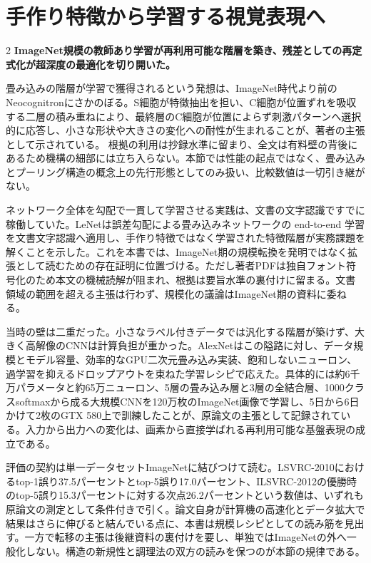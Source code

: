 \documentclass[lualatex,a4paper,10pt]{jlreq}
\begin{document}
\section{手作り特徴から学習する視覚表現へ}
\label{sec:p01}
\begin{multicols}{2}
\raggedcolumns
\noindent\textbf{ImageNet規模の教師あり学習が再利用可能な階層を築き、残差としての再定式化が超深度の最適化を切り開いた。}\autocite{vmd003,vmd004}\par\medskip
\noindent 畳み込みの階層が学習で獲得されるという発想は、ImageNet時代より前のNeocognitronにさかのぼる。S細胞が特徴抽出を担い、C細胞が位置ずれを吸収する二層の積み重ねにより、最終層のC細胞が位置によらず刺激パターンへ選択的に応答し、小さな形状や大きさの変化への耐性が生まれることが、著者の主張として示されている。 根拠の利用は抄録水準に留まり、全文は有料壁の背後にあるため機構の細部には立ち入らない。本節では性能の起点ではなく、畳み込みとプーリング構造の概念上の先行形態としてのみ扱い、比較数値は一切引き継がない。\autocite{vmd001}\par\medskip
\noindent ネットワーク全体を勾配で一貫して学習させる実践は、文書の文字認識ですでに稼働していた。LeNetは誤差勾配による畳み込みネットワークの end-to-end 学習を文書文字認識へ適用し、手作り特徴ではなく学習された特徴階層が実務課題を解くことを示した。これを本書では、ImageNet期の規模転換を発明ではなく拡張として読むための存在証明に位置づける。ただし著者PDFは独自フォント符号化のため本文の機械読解が阻まれ、根拠は要旨水準の裏付けに留まる。文書領域の範囲を超える主張は行わず、規模化の議論はImageNet期の資料に委ねる。\autocite{vmd002}\par\medskip
\noindent 当時の壁は二重だった。小さなラベル付きデータでは汎化する階層が築けず、大きく高解像のCNNは計算負担が重かった。AlexNetはこの隘路に対し、データ規模とモデル容量、効率的なGPU二次元畳み込み実装、飽和しないニューロン、過学習を抑えるドロップアウトを束ねた学習レシピで応えた。具体的には約6千万パラメータと約65万ニューロン、5層の畳み込み層と3層の全結合層、1000クラスsoftmaxから成る大規模CNNを120万枚のImageNet画像で学習し、5日から6日かけて2枚のGTX 580上で訓練したことが、原論文の主張として記録されている。入力から出力への変化は、画素から直接学ばれる再利用可能な基盤表現の成立である。\autocite{vmd003}\par\medskip
\noindent 評価の契約は単一データセットImageNetに結びつけて読む。LSVRC-2010におけるtop-1誤り37.5パーセントとtop-5誤り17.0パーセント、ILSVRC-2012の優勝時のtop-5誤り15.3パーセントに対する次点26.2パーセントという数値は、いずれも原論文の測定として条件付きで引く。論文自身が計算機の高速化とデータ拡大で結果はさらに伸びると結んでいる点に、本書は規模レシピとしての読み筋を見出す。一方で転移の主張は後継資料の裏付けを要し、単独ではImageNetの外へ一般化しない。構造の新規性と調理法の双方の読みを保つのが本節の規律である。\autocite{vmd003}\par\medskip

\end{multicols}
\end{document}
